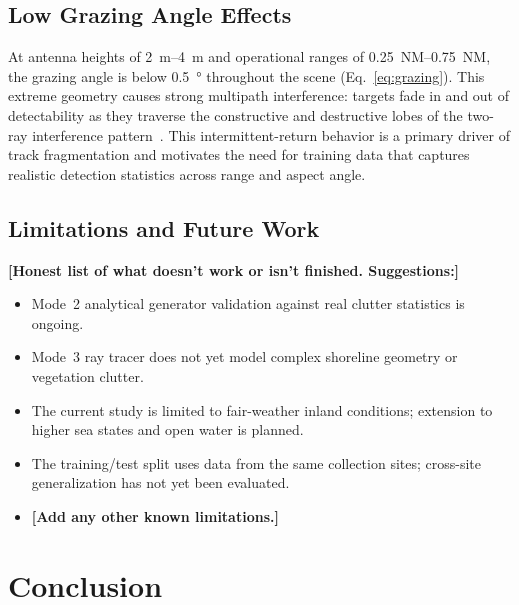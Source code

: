\documentclass[conf]{new-aiaa}
\newcommand{\ph}[1]{\textbf{[#1]}}
\begin{document}
\subsection{Low Grazing Angle Effects}

At antenna heights of \SIrange{2}{4}{\meter} and operational ranges of \SIrange{0.25}{0.75}{NM}, the grazing angle is below \SI{0.5}{\degree} throughout the scene (Eq.~\ref{eq:grazing}). This extreme geometry causes strong multipath interference: targets fade in and out of detectability as they traverse the constructive and destructive lobes of the two-ray interference pattern~\cite{long2001radar}. This intermittent-return behavior is a primary driver of track fragmentation and motivates the need for training data that captures realistic detection statistics across range and aspect angle.

\subsection{Limitations and Future Work}

\ph{Honest list of what doesn't work or isn't finished. Suggestions:}
\begin{itemize}
    \item Mode~2 analytical generator validation against real clutter statistics is ongoing.
    \item Mode~3 ray tracer does not yet model complex shoreline geometry or vegetation clutter.
    \item The current study is limited to fair-weather inland conditions; extension to higher sea states and open water is planned.
    \item The training/test split uses data from the same collection sites; cross-site generalization has not yet been evaluated.
    \item \ph{Add any other known limitations.}
\end{itemize}

\section{Conclusion}
\label{sec:conclusion}
\end{document}
